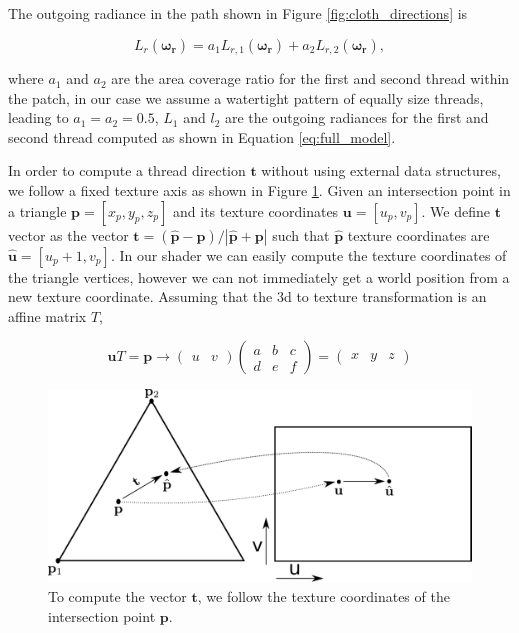 \documentclass[12pt]{article}
\begin{document}
The outgoing radiance in the path shown in Figure \ref{fig:cloth_directions} is

\begin{equation}
L_r(\boldsymbol{\omega_r}) = a_1 L_{r,1}(\boldsymbol{\omega_r}) + a_2 L_{r,2}(\boldsymbol{\omega_r}),
\end{equation}

where $a_1$ and $a_2$ are the area coverage ratio for the first and second thread within the patch, in our case we assume a watertight pattern of equally size threads, leading to $a_1 = a_2 = 0.5$, $L_1$ and $l_2$ are the outgoing radiances for the first and second thread computed as shown in Equation \ref{eq:full_model}.

In order to compute a thread direction $\mathbf{t}$ without using external data structures, we follow a fixed texture axis as shown in Figure \ref{fig:thread_uv_coord}.
Given an intersection point in a triangle $\mathbf{p} = \left[ x_p, y_p,z_p \right]$ and its texture coordinates $\mathbf{u} = \left[ u_p, v_p \right]$.
We define $\mathbf{t}$ vector as the vector $\mathbf{t} = (\hat{\mathbf{p}} - \mathbf{p})/ \left|\hat{\mathbf{p}} + \mathbf{p} \right|$ such that $\hat{\mathbf{p}}$ texture coordinates are $\hat{\mathbf{u}} = \left[ u_p + 1, v_p \right]$.
In our shader we can easily compute the texture coordinates of the triangle vertices, however we can not immediately get a world position from a new texture coordinate.
Assuming that the 3d to texture transformation is an affine matrix $T$,

\begin{equation}
\mathbf{u} T = \mathbf{p} \rightarrow
\begin{pmatrix}
u & v
\end{pmatrix}
\begin{pmatrix}
a & b & c \\
d & e & f
\end{pmatrix} =
\begin{pmatrix}
x & y & z
\end{pmatrix}
\label{eq:uv_to_3d}
\end{equation}

\begin{figure}[ht!]
\centering
\includegraphics[width=\textwidth]{images/thread_3d_coord}
	\caption{To compute the vector $\mathbf{t}$, we follow the texture coordinates of the intersection point $\mathbf{p}$.}
	\label{fig:thread_uv_coord}
\end{figure}
\end{document}
